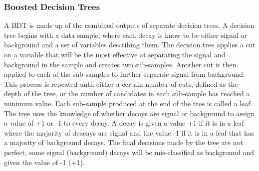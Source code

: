 \subsubsection{Boosted Decision Trees}
\label{sec:GeneralBDT}
A BDT is made up of the combined outputs of separate decision trees. A decision tree begins with a data sample, where each decay is know to be either signal or background and a set of variables describing them. The decision tree applies a cut on a variable that will be the most effective at separating the signal and background in the sample and creates two sub-samples. Another cut is then applied to each of the sub-samples to further separate signal from background. This process is repeated until either a certain number of cuts, defined as the depth of the tree, or the number of candidates in each sub-sample has reached a minimum value. Each sub-sample produced at the end of the tree is called a leaf. The tree uses the knowledge of whether decays are signal or background to assign a value of +1 or -1 to every decay. A decay is given a value +1 if it is in a leaf where the majority of deacays are signal and the value -1 if it is in a leaf that has a majority of background decays. The final decisions made by the tree are not perfect, some signal (background) decays will be mis-classified as background and given the value of -1 (+1). %

